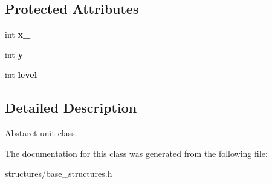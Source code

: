 \subsection*{Protected Attributes}
\begin{DoxyCompactItemize}
\item 
\mbox{\label{classbase__structures_1_1Unit_a61fbb9ba4b8a0aaeca71cf53c2d3403a}} 
int {\bfseries x\+\_\+}
\item 
\mbox{\label{classbase__structures_1_1Unit_a5d3adefc5334468a561a7660c29a4758}} 
int {\bfseries y\+\_\+}
\item 
\mbox{\label{classbase__structures_1_1Unit_a1307d6bde56762220de1b4bcd622d005}} 
int {\bfseries level\+\_\+}
\end{DoxyCompactItemize}


\subsection{Detailed Description}
Abstarct unit class. 

The documentation for this class was generated from the following file\+:\begin{DoxyCompactItemize}
\item 
structures/base\+\_\+structures.\+h\end{DoxyCompactItemize}
